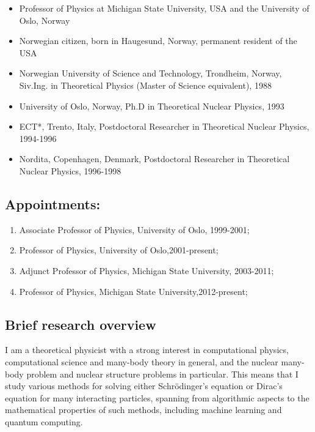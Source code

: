 \documentclass[%
oneside,                 %
final,                   %
10pt]{article}
\begin{document}
\begin{itemize}
\item Professor of Physics at Michigan State University, USA and the University of Oslo, Norway

\item Norwegian citizen, born in Haugesund, Norway, permanent resident of the USA

\item Norwegian University of Science and Technology, Trondheim, Norway,  Siv.Ing. in Theoretical Physics (Master of Science equivalent),  1988 

\item University of Oslo, Norway,  Ph.D in Theoretical Nuclear Physics, 1993

\item ECT*, Trento, Italy,  Postdoctoral Researcher in Theoretical Nuclear Physics,  1994-1996

\item Nordita, Copenhagen, Denmark, Postdoctoral Researcher in Theoretical Nuclear Physics, 1996-1998
\end{itemize}

\noindent
\subsection{Appointments:}

\begin{enumerate}
\item Associate Professor of Physics, University of Oslo, 1999-2001;

\item Professor of Physics, University of Oslo,2001-present;

\item Adjunct Professor of Physics, Michigan State University, 2003-2011;

\item Professor of Physics, Michigan State University,2012-present;
\end{enumerate}

\noindent
\subsection{Brief research overview}

I am a theoretical physicist with a strong interest in 
computational physics, computational science and many-body theory in general, and 
the nuclear many-body problem and nuclear structure problems in particular. 
This means that I study various methods for solving either Schrödinger's equation or 
Dirac's equation for many interacting particles, spanning from 
algorithmic aspects to the mathematical properties of such methods, including machine learning and quantum computing. 
\end{document}
